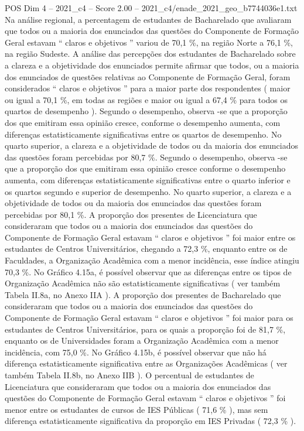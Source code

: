 \begin{textsample}{POS Dim 4 – 2021\_c4 – Score 2.00 – 2021\_c4/enade\_2021\_geo\_b7744036e1.txt}
Na análise regional, a percentagem de estudantes de Bacharelado que avaliaram que todos ou a maioria dos enunciados das questões do Componente de Formação Geral estavam “ claros e objetivos ” variou de 70,1 \%, na região Norte a 76,1 \%, na região Sudeste.
A análise das percepções dos estudantes de Bacharelado sobre a clareza e a objetividade dos enunciados permite afirmar que todos, ou a maioria dos enunciados de questões relativas ao Componente de Formação Geral, foram considerados “ claros e objetivos ” para a maior parte dos respondentes ( maior ou igual a 70,1 \%, em todas as regiões e maior ou igual a 67,4 \% para todos os quartos de desempenho ).
Segundo o desempenho, observa -se que a proporção dos que emitiram essa opinião cresce, conforme o desempenho aumenta, com diferenças estatisticamente significativas entre os quartos de desempenho.
No quarto superior, a clareza e a objetividade de todos ou da maioria dos enunciados das questões foram percebidas por 80,7 \%.
Segundo o desempenho, observa -se que a proporção dos que emitiram essa opinião cresce conforme o desempenho aumenta, com diferenças estatisticamente significativas entre o quarto inferior e os quartos segundo e superior de desempenho.
No quarto superior, a clareza e a objetividade de todos ou da maioria dos enunciados das questões foram percebidas por 80,1 \%.
A proporção dos presentes de Licenciatura que consideraram que todos ou a maioria dos enunciados das questões do Componente de Formação Geral estavam “ claros e objetivos ” foi maior entre os estudantes de Centros Universitários, chegando a 72,3 \%, enquanto entre os de Faculdades, a Organização Acadêmica com a menor incidência, esse índice atingiu 70,3 \%.
No Gráfico 4.15a, é possível observar que as diferenças entre os tipos de Organização Acadêmica não são estatisticamente significativas ( ver também Tabela II.8a, no Anexo IIA ).
A proporção dos presentes de Bacharelado que consideraram que todos ou a maioria dos enunciados das questões do Componente de Formação Geral estavam “ claros e objetivos ” foi maior para os estudantes de Centros Universitários, para os quais a proporção foi de 81,7 \%, enquanto os de Universidades foram a Organização Acadêmica com a menor incidência, com 75,0 \%.
No Gráfico 4.15b, é possível observar que não há diferença estatisticamente significativa entre as Organizações Acadêmicas ( ver também Tabela II.8b, no Anexo IIB ).
O percentual de estudantes de Licenciatura que consideraram que todos ou a maioria dos enunciados das questões do Componente de Formação Geral estavam “ claros e objetivos ” foi menor entre os estudantes de cursos de IES Públicas ( 71,6 \% ), mas sem diferença estatisticamente significativa da proporção em IES Privadas ( 72,3 \% ).

\end{textsample}
